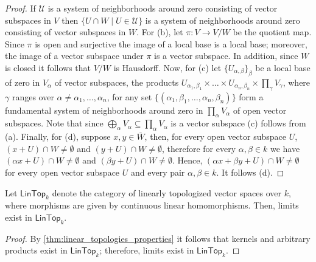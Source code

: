 \begin{proof}
	If $\mathscr{U}$ is a system of neighborhoods around zero consisting of vector subspaces in $V$ then $\{U\cap W\mid U \in \mathscr{U}\}$ is a system of neighborhoods around zero consisting of vector subspaces in $W$. For (b), let $\pi\colon V \to V/W$ be the quotient map. Since $\pi$ is open and surjective the image of a local base is a local base; moreover, the image of a vector subspace under $\pi$ is a vector subspace. In addition, since $W$ is closed it follows that $V/W$ is Hausdorff.  Now, for (c) let $\{U_{\alpha, \beta}\}_{\beta}$ be a local base of zero in $V_{\alpha}$ of vector subspaces, the products $U_{\alpha_{1}, \beta_{1}} \times \ldots \times U_{\alpha_{n}, \beta_{n}} \times \prod_{\gamma} V_{\gamma}$, where $\gamma$ ranges over $\alpha \neq \alpha_{1}, \ldots, \alpha_{n}$, for any set $\{(\alpha_{1}, \beta_{1}, \ldots, \alpha_{n}, \beta_{n})\}$ form a fundamental system of neighborhoods around zero in $\prod_{\alpha} V_{\alpha}$ of open vector subspaces. Note that since $\bigoplus_{\alpha} V_{\alpha} \subseteq \prod_{\alpha} V_{\alpha}$ is a vector subspace (c) follows from (a). Finally, for (d), suppose $x,y\in \overline{W}$, then, for every open vector subspace $U$, $(x + U)\cap W \neq \emptyset$ and $(y + U)\cap W \neq \emptyset$, therefore for every $\alpha, \beta \in k$ we have $(\alpha x + U)\cap W \neq \emptyset$ and $(\beta y + U)\cap W \neq \emptyset$. Hence, $(\alpha x + \beta y + U)\cap W\neq \emptyset$ for every open vector subspace $U$ and every pair $\alpha, \beta\in k$. It follows (d).
\end{proof}
\begin{corollary}\label{cor:limits-and-colimits-in-lintop-category}
	Let $\mathsf{LinTop}_{k}$ denote the category of linearly topologized vector spaces over $k$, where morphisms are given by continuous linear homomorphisms. Then, limits exist in $\mathsf{LinTop}_{k}$. 
\end{corollary}
\begin{proof}
	By \cref{thm:linear_topologies_properties} it follows that kernels and arbitrary products exist in $\mathsf{LinTop}_{k}$; therefore, limits exist in $\mathsf{LinTop}_{k}$. 
\end{proof}

